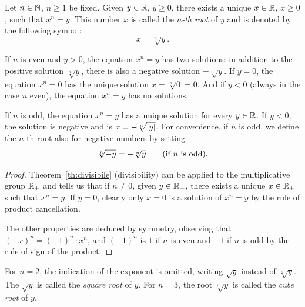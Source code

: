 \begin{theorem}[$n$-th Root]
  \label{radice!$n$-esima}%
Let $n\in {\mathbb N}$, $n\ge 1$ be fixed.
Given $y\in {\mathbb R}$, $y \ge 0$, there exists a unique $x\in {\mathbb R}$, $x\ge 0$, such
that $x^n = y$.
This number $x$ is called the \emph{$n$-th root} of $y$ and is denoted by the
following symbol:
\[
  x = \sqrt[n]{y}.
\]

If $n$ is even and $y>0$, the equation $x^n=y$ has two solutions: in addition to
the positive solution $\sqrt[n]{y}$, there is also a negative solution
$-\sqrt[n]{y}$. If $y=0$, the equation $x^n=0$ has the unique solution
$x=\sqrt[n]{0}=0$. And if $y<0$ (always in the case $n$ even), the equation $x^n
= y$ has no solutions.

If $n$ is odd, the equation $x^n=y$ has a unique solution for every $y\in {\mathbb R}$.
If $y<0$, the solution is negative and is $x=-\sqrt[n]{{\left|y\right|}}$. For
convenience, if $n$ is odd, we define the $n$-th root also for negative numbers
by setting
\[
  \sqrt[n]{-y} =  -\sqrt[n]{y}\qquad\text{(if $n$ is odd).}
\]
\end{theorem}
\begin{proof}
Theorem~\ref{th:divisibile} (divisibility) can be applied to the multiplicative
group ${\mathbb R}_+$ and tells us that if $n\neq 0$, given $y\in {\mathbb R}_+$, there exists a
unique $x\in {\mathbb R}_+$ such that $x^n = y$. If $y=0$, clearly only $x=0$ is a
solution of $x^n= y$ by the rule of product cancellation.

The other properties are deduced by symmetry, observing that $(-x)^n =
(-1)^n\cdot x^n$, and $(-1)^n$ is $1$ if $n$ is even and $-1$ if $n$ is odd by
the rule of sign of the product.
\end{proof}

%
%
For $n=2$, the indication of the exponent is omitted, writing $\sqrt y$ instead
of $\sqrt[2] y$. The $\sqrt y$ is called the \emph{square root} of $y$. For
$n=3$, the root $\sqrt[3]{y}$ is called the \emph{cube root} of $y$.

